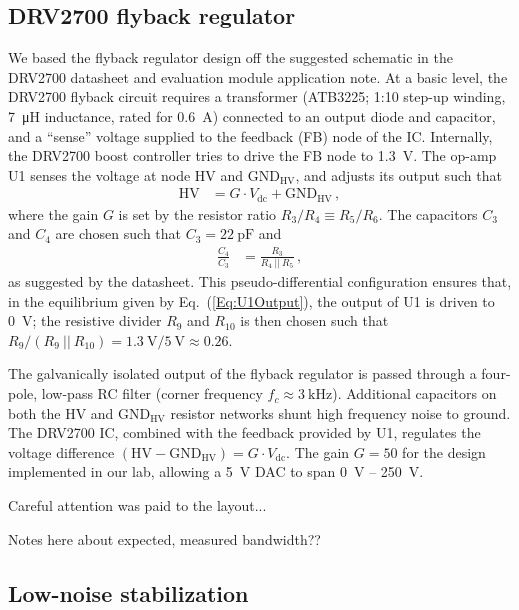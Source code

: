 \documentclass[aip,rsi,reprint]{revtex4-1} %
\begin{document}
\subsection{DRV2700 flyback regulator}
\label{Sec:DRV2700}

We based the flyback regulator design off the suggested schematic in the DRV2700 datasheet and evaluation module application note.
At a basic level, the DRV2700 flyback circuit requires a transformer (ATB3225; 1:10 step-up winding, \SI{7}{\micro\henry} inductance, rated for \SI{0.6}{\ampere}) connected to an output diode and capacitor, and a ``sense'' voltage supplied to the feedback (FB) node of the IC.
Internally, the DRV2700 boost controller tries to drive the FB node to \SI{1.3}{\volt}.
The op-amp U1 senses the voltage at node HV and $\text{GND}_\text{HV}$, and adjusts its output such that
\begin{align}
\label{Eq:U1Output}
\text{HV} &= G\cdot V_{\text{dc}} + \text{GND}_{\text{HV}}\,,
\end{align}
where the gain $G$ is set by the resistor ratio $R_3/R_4 \equiv R_5/R_6$.
The capacitors $C_3$ and $C_4$ are chosen such that $C_3 = \SI{22}{\pico\farad}$ and 
\begin{align}
\frac{C_4}{C_3} &= \frac{R_3}{R_4~||~R_5}\,,
\end{align}
as suggested by the datasheet.
This pseudo-differential configuration ensures that, in the equilibrium given by Eq.~(\ref{Eq:U1Output}), the output of U1 is driven to \SI{0}{\volt}; the resistive divider $R_9$ and $R_{10}$ is then chosen such that $R_9/(R_9~||~R_{10}) = \SI{1.3}{\volt}/\SI{5}{\volt} \approx \num{0.26}$.

The galvanically isolated output of the flyback regulator is passed through a four-pole, low-pass RC filter (corner frequency $f_c \approx \SI{3}{\kilo\hertz}$). 
Additional capacitors on both the HV and $\text{GND}_{\text{HV}}$ resistor networks shunt high frequency noise to ground. 
The DRV2700 IC, combined with the feedback provided by U1, regulates the voltage difference $(\text{HV}-\text{GND}_{\text{HV}}) = G\cdot V_{\text{dc}}$. The gain $G = 50$ for the design implemented in our lab, allowing a \SI{5}{\volt} DAC to span \SI{0}{\volt} -- \SI{250}{\volt}.


Careful attention was paid to the layout...

Notes here about expected, measured bandwidth??


\subsection{Low-noise stabilization}
\label{Sec:LowNoiseStabilization}
\end{document}
